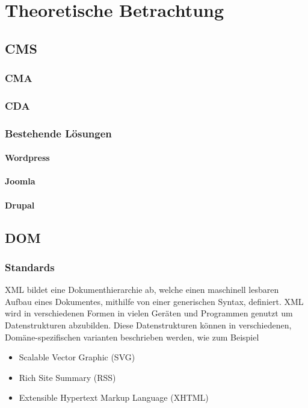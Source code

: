 \chapter{Theoretische Betrachtung}
\section{\acl{CMS}}
\subsection{\acl{CMA}}
\subsection{\acl{CDA}}
\subsection{Bestehende Lösungen}
\subsubsection{Wordpress}
\subsubsection{Joomla}
\subsubsection{Drupal}

\section{\acl{DOM}}
\subsection{Standards}
\ac{XML} bildet eine Dokumenthierarchie ab, welche einen maschinell lesbaren Aufbau eines
Dokumentes, mithilfe von einer generischen Syntax, definiert. \ac{XML} wird in
verschiedenen Formen in vielen Geräten und Programmen genutzt um Datenstrukturen
abzubilden. Diese Datenstrukturen können in verschiedenen, Domäne-spezifischen
varianten beschrieben werden, wie zum Beispiel

\begin{itemize}
\item Scalable Vector Graphic (SVG)
\item Rich Site Summary (RSS)
\item Extensible Hypertext Markup Language (XHTML)
\end{itemize}

